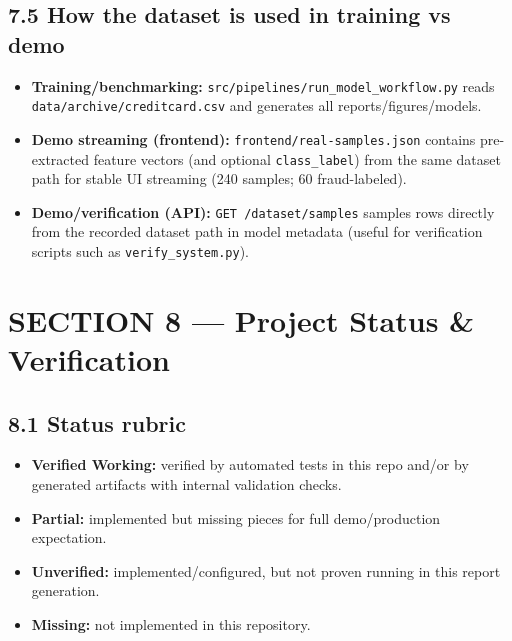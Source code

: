 \documentclass[11pt]{article}
\newcommand{\code}[1]{\texttt{#1}}
\begin{document}
\subsection*{7.5 How the dataset is used in training vs demo}
\begin{itemize}
  \item \textbf{Training/benchmarking:} \code{src/pipelines/run\_model\_workflow.py} reads \code{data/archive/creditcard.csv} and generates all reports/figures/models.
  \item \textbf{Demo streaming (frontend):} \code{frontend/real-samples.json} contains pre-extracted feature vectors (and optional \code{class\_label}) from the same dataset path for stable UI streaming (240 samples; 60 fraud-labeled).
  \item \textbf{Demo/verification (API):} \code{GET /dataset/samples} samples rows directly from the recorded dataset path in model metadata (useful for verification scripts such as \code{verify\_system.py}).
\end{itemize}

\section*{SECTION 8 — Project Status \& Verification}

\subsection*{8.1 Status rubric}
\begin{itemize}
  \item \textbf{Verified Working:} verified by automated tests in this repo and/or by generated artifacts with internal validation checks.
  \item \textbf{Partial:} implemented but missing pieces for full demo/production expectation.
  \item \textbf{Unverified:} implemented/configured, but not proven running in this report generation.
  \item \textbf{Missing:} not implemented in this repository.
\end{itemize}
\end{document}
